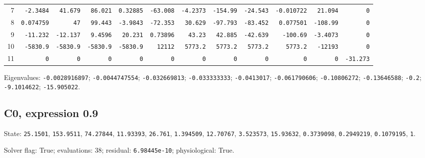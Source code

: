 \begin{landscape}
\begin{tabular}{rrrrrrrrrrrr}
7 & \texttt{-2.3484} & \texttt{41.679} & \texttt{86.021} & \texttt{0.32885} & \texttt{-63.008} & \texttt{-4.2373} & \texttt{-154.99} & \texttt{-24.543} & \texttt{-0.010722} & \texttt{21.094} & \texttt{0} \\

8 & \texttt{0.074759} & \texttt{47} & \texttt{99.443} & \texttt{-3.9843} & \texttt{-72.353} & \texttt{30.629} & \texttt{-97.793} & \texttt{-83.452} & \texttt{0.077501} & \texttt{-108.99} & \texttt{0} \\

9 & \texttt{-11.232} & \texttt{-12.137} & \texttt{9.4596} & \texttt{20.231} & \texttt{0.73896} & \texttt{43.23} & \texttt{42.885} & \texttt{-42.639} & \texttt{-100.69} & \texttt{-3.4073} & \texttt{0} \\

10 & \texttt{-5830.9} & \texttt{-5830.9} & \texttt{-5830.9} & \texttt{-5830.9} & \texttt{12112} & \texttt{5773.2} & \texttt{5773.2} & \texttt{5773.2} & \texttt{5773.2} & \texttt{-12193} & \texttt{0} \\

11 & \texttt{0} & \texttt{0} & \texttt{0} & \texttt{0} & \texttt{0} & \texttt{0} & \texttt{0} & \texttt{0} & \texttt{0} & \texttt{0} & \texttt{-31.273} \\

\bottomrule\end{tabular}\par\endgroup

{\scriptsize Eigenvalues: \texttt{-0.0028916897}; \texttt{-0.0044747554}; \texttt{-0.032669813}; \texttt{-0.033333333}; \texttt{-0.0413017}; \texttt{-0.061790606}; \texttt{-0.10806272}; \texttt{-0.13646588}; \texttt{-0.2}; \texttt{-9.1014622}; \texttt{-15.905022}.\par}

\subsection*{C0, expression 0.9}
{\scriptsize State: \texttt{25.1501}, \texttt{153.9511}, \texttt{74.27844}, \texttt{11.93393}, \texttt{26.761}, \texttt{1.394509}, \texttt{12.70767}, \texttt{3.523573}, \texttt{15.93632}, \texttt{0.3739098}, \texttt{0.2949219}, \texttt{0.1079195}, \texttt{1}.\par

Solver flag: True; evaluations: 38; residual: \texttt{6.98445e-10}; physiological: True.\par}

\begingroup\scriptsize\setlength{\tabcolsep}{3pt}\centering
\begin{tabular}{rrrrrrrrrrrr}\toprule


\end{tabular}
\end{landscape}
